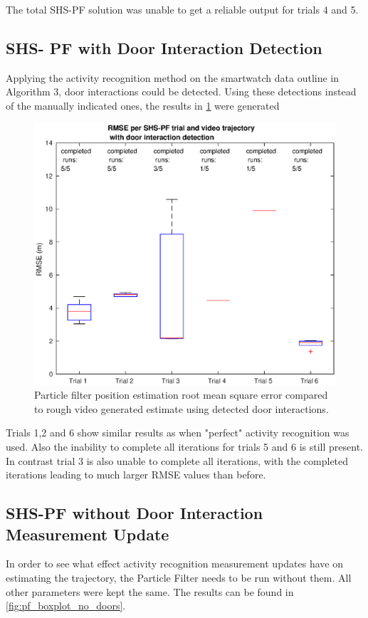 The total SHS-PF solution was unable to get a reliable output for trials 4 and 5.\par 

\subsection{SHS- PF with Door Interaction Detection}
Applying the activity recognition method on the smartwatch data outline in Algorithm 3, door interactions could be detected. Using these detections instead of the manually indicated ones, the results in \cref{fig:rmse_per_trial_with_activity_recognition} were generated

\begin{figure}[H]
	\centering
	\includegraphics[width=0.7\linewidth]{images/RMSE_door_interaction_detections_ar_shspf_trials}
	\caption[Particle Filter position estimation performance with door interaction]{Particle filter position estimation root mean square error compared to rough video generated estimate using detected door interactions.}
	\label{fig:rmse_per_trial_with_activity_recognition}
\end{figure}

Trials 1,2 and 6 show similar results as when "perfect" activity recognition was used. Also the inability to complete all iterations for trials 5 and 6 is still present. In contrast trial 3 is also unable to complete all iterations, with the completed iterations leading to much larger RMSE values than before. 

\subsection{SHS-PF without Door Interaction Measurement Update}
In order to see what effect activity recognition measurement updates have on estimating the trajectory, the Particle Filter needs to be run without them. All other parameters were kept the same. The results can be found in \cref{fig:pf_boxplot_no_doors}.

